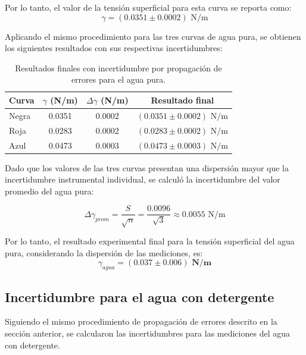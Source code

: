 \documentclass[11pt,a4paper]{article}
\begin{document}
Por lo tanto, el valor de la tensión superficial para esta curva se reporta como:
\begin{equation*}
    \gamma = (0.0351 \pm 0.0002) \text{ N/m}
\end{equation*}

Aplicando el mismo procedimiento para las tres curvas de agua pura, se obtienen los siguientes resultados con sus respectivas incertidumbres:

\begin{table}[H]
    \centering
    \label{tab:resultados_incertidumbre}
    \begin{tabular}{@{}lccc@{}}
        \toprule
        \textbf{Curva} & \textbf{\(\gamma\) (N/m)} & \textbf{\(\Delta \gamma\) (N/m)} & \textbf{Resultado final} \\ \midrule
        Negra & 0.0351 & 0.0002 & \((0.0351 \pm 0.0002) \text{ N/m}\) \\
        Roja  & 0.0283 & 0.0002 & \((0.0283 \pm 0.0002) \text{ N/m}\) \\
        Azul  & 0.0473 & 0.0003 & \((0.0473 \pm 0.0003) \text{ N/m}\) \\ \bottomrule
    \end{tabular}
    \caption{Resultados finales con incertidumbre por propagación de errores para el agua pura.}

\end{table}

Dado que los valores de las tres curvas presentan una dispersión mayor que la incertidumbre instrumental individual, se calculó la incertidumbre del valor promedio del agua pura:

\begin{equation*}
    \Delta \gamma_{prom} = \frac{S}{\sqrt{n}} = \frac{0.0096}{\sqrt{3}} \approx 0.0055 \text{ N/m}
\end{equation*}

Por lo tanto, el resultado experimental final para la tensión superficial del agua pura, considerando la dispersión de las mediciones, es:
\begin{equation}
    \gamma_{agua} = \mathbf{(0.037 \pm 0.006) \text{ N/m}}
\end{equation}

\subsection{Incertidumbre para el agua con detergente}

Siguiendo el mismo procedimiento de propagación de errores descrito en la sección anterior, se calcularon las incertidumbres para las mediciones del agua con detergente. 
\end{document}
